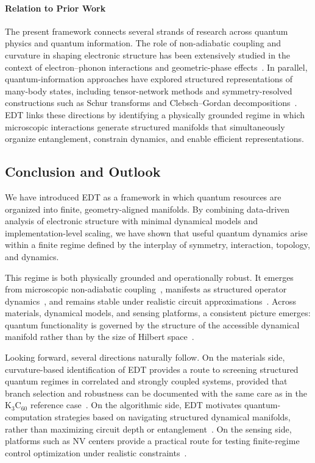 ﻿\documentclass[aps,prx,reprint,superscriptaddress,longbibliography,floatfix]{revtex4-2}
\begin{document}
\paragraph*{Relation to Prior Work}

The present framework connects several strands of research across quantum physics and quantum information. The role of non-adiabatic coupling and curvature in shaping electronic structure has been extensively studied in the context of electron--phonon interactions and geometric-phase effects~\cite{Mead1979,Yarkony1996,Giustino2017}. In parallel, quantum-information approaches have explored structured representations of many-body states, including tensor-network methods and symmetry-resolved constructions such as Schur transforms and Clebsch--Gordan decompositions~\cite{Schollwock2011,Bacon2006}. EDT links these directions by identifying a physically grounded regime in which microscopic interactions generate structured manifolds that simultaneously organize entanglement, constrain dynamics, and enable efficient representations.

\subsection{Conclusion and Outlook}

We have introduced EDT as a framework in which quantum resources are organized into finite, geometry-aligned manifolds. By combining data-driven analysis of electronic structure with minimal dynamical models and implementation-level scaling, we have shown that useful quantum dynamics arise within a finite regime defined by the interplay of symmetry, interaction, topology, and dynamics.

This regime is both physically grounded and operationally robust. It emerges from microscopic non-adiabatic coupling~\cite{Mead1979,Yarkony1996}, manifests as structured operator dynamics~\cite{Swingle2018}, and remains stable under realistic circuit approximations~\cite{Lloyd1996,Childs2019}. Across materials, dynamical models, and sensing platforms, a consistent picture emerges: quantum functionality is governed by the structure of the accessible dynamical manifold rather than by the size of Hilbert space~\cite{Amico2008,Eisert2010}.

Looking forward, several directions naturally follow. On the materials side, curvature-based identification of EDT provides a route to screening structured quantum regimes in correlated and strongly coupled systems, provided that branch selection and robustness can be documented with the same care as in the K$_3$C$_{60}$ reference case~\cite{Capone2009}. On the algorithmic side, EDT motivates quantum-computation strategies based on navigating structured dynamical manifolds, rather than maximizing circuit depth or entanglement~\cite{Preskill2018}. On the sensing side, platforms such as NV centers provide a practical route for testing finite-regime control optimization under realistic constraints~\cite{Degen2017}.
\end{document}
